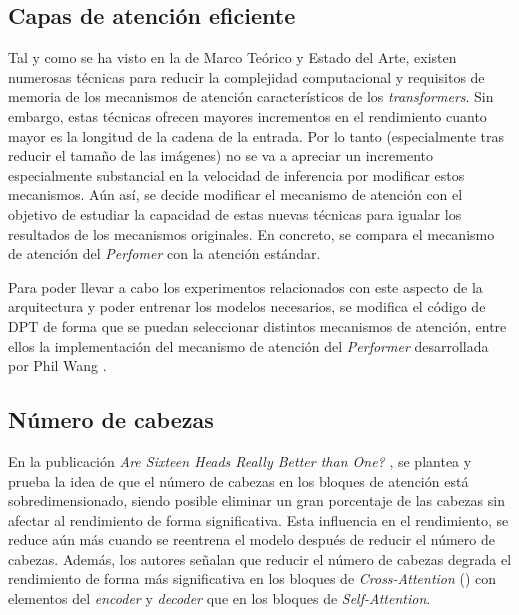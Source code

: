

\subsection{Capas de atención eficiente}

Tal y como se ha visto en la  de Marco Teórico y Estado del Arte, existen numerosas técnicas para reducir la complejidad computacional y requisitos de memoria de los mecanismos de atención característicos de los \textit{transformers}. Sin embargo, estas técnicas ofrecen mayores incrementos en el rendimiento cuanto mayor es la longitud de la cadena de la entrada. Por lo tanto (especialmente tras reducir el tamaño de las imágenes) no se va a apreciar un incremento especialmente substancial en la velocidad de inferencia por modificar estos mecanismos. Aún así, se decide modificar el mecanismo de atención con el objetivo de estudiar la capacidad de estas nuevas técnicas para igualar los resultados de los mecanismos originales. En concreto, se compara el mecanismo de atención del \textit{Perfomer} con la atención estándar.

Para poder llevar a cabo los experimentos relacionados con este aspecto de la arquitectura y poder entrenar los modelos necesarios, se modifica el código de DPT de forma que se puedan seleccionar distintos mecanismos de atención, entre ellos la implementación del mecanismo de atención del \textit{Performer} desarrollada por Phil Wang \cite{pwperformer}.

\subsection{Número de cabezas}
En la publicación \textit{Are Sixteen Heads Really Better than One?} \cite{are16headsbetterthan1}, se plantea y prueba la idea de que el número de cabezas en los bloques de atención está sobredimensionado, siendo posible eliminar un gran porcentaje de las cabezas sin afectar al rendimiento de forma significativa. Esta influencia en el rendimiento, se reduce aún más cuando se reentrena el modelo después de reducir el número de cabezas.  Además, los autores señalan que reducir el número de cabezas degrada el rendimiento de forma más significativa en los bloques de \textit{Cross-Attention} () con elementos del \textit{encoder} y \textit{decoder} que en los bloques de \textit{Self-Attention}. 

